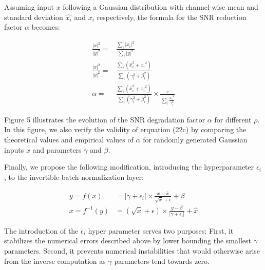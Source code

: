 \documentclass[twocolumn]{bmcart}
\begin{document}
Assuming input $x$ following a Gaussian distribution with channel-wise mean and standard deviation 
$\hat{x_i}$ and $\dot{x_i}$ respectively, the formula for the SNR reduction factor $\alpha$ becomes: 

\begin{subequations}
\begin{align}
\frac{|x|^2}{|y|^2} =& \frac{\sum_i |x_i|^2}{\sum_i|y|^2} \\
\frac{|x|^2}{|y|^2} =& \frac{\sum_i (\hat{x}_i^2 + \dot{x_i}^2)}{\sum_i (\gamma_i^2 + \beta_i^2)} \\
\alpha              =& \frac{\sum_i (\hat{x}_i^2 + \dot{x_i}^2)}{\sum_i (\gamma_i^2 + \beta_i^2)} \times \frac{c}{\sum_i \frac{\dot{x_i}^2}{\gamma_i^2}}
\end{align}
\end{subequations}

Figure 5 illustrates the evolution of the SNR degradation factor $\alpha$ for different $\rho$.
In this figure, we also verify the validity of erquation (22c) by comparing the theoretical values and empirical values of $\alpha$ for randomly generated Gaussian inputs $x$ and parameters $\gamma$ and $\beta$.

Finally, we propose the following modification, introducing the hyperparameter $\epsilon_i$, to the invertible batch normalization layer:

\begin{subequations}
\begin{align}
y = f(x) &= |\gamma + \epsilon_i| \times \frac{x - \hat{x}}{\sqrt{\dot{x}} + \epsilon} + \beta \\
x = f^{-1}(y) &= (\sqrt{\dot{x}} + \epsilon) \times \frac{y -  \beta}{|\gamma + \epsilon_i|}  + \hat{x}
\end{align}
\end{subequations}

The introduction of the $\epsilon_i$ hyper parameter serves two purposes: 
First, it stabilizes the numerical errors described above by lower bounding the smallest $\gamma$ parameters. 
Second, it prevents numerical instabilities that would otherwise arise from the inverse computation as $\gamma$ parameters tend towards zero. 
\end{document}
